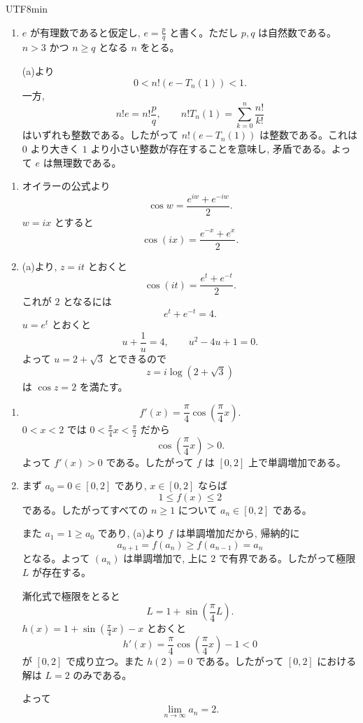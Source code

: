 \documentclass[a4paper,12pt]{article}
\newcommand{\ans}[1]{\par\vspace{0.8em}\noindent{\large 問題 #1}\quad}
\begin{document}
\begin{CJK}{UTF8}{min}
\begin{enumerate}
\item $e$ が有理数であると仮定し, $e=\frac{p}{q}$ と書く。ただし $p,q$ は自然数である。$n>3$ かつ $n\ge q$ となる $n$ をとる。

(a)より
\[
0<n!\left(e-T_n(1)\right)<1.
\]
一方,
\[
n!e=n!\frac{p}{q},\qquad
n!T_n(1)=\sum_{k=0}^{n}\frac{n!}{k!}
\]
はいずれも整数である。したがって $n!(e-T_n(1))$ は整数である。これは $0$ より大きく $1$ より小さい整数が存在することを意味し, 矛盾である。よって $e$ は無理数である。
\end{enumerate}

\ans{9}
\begin{enumerate}
\item オイラーの公式より
\[
\cos w=\frac{e^{iw}+e^{-iw}}{2}.
\]
$w=ix$ とすると
\[
\cos(ix)=\frac{e^{-x}+e^x}{2}.
\]

\item (a)より, $z=it$ とおくと
\[
\cos(it)=\frac{e^t+e^{-t}}{2}.
\]
これが $2$ となるには
\[
e^t+e^{-t}=4.
\]
$u=e^t$ とおくと
\[
u+\frac1u=4,\qquad u^2-4u+1=0.
\]
よって $u=2+\sqrt3$ とできるので
\[
z=i\log(2+\sqrt3)
\]
は $\cos z=2$ を満たす。
\end{enumerate}

\ans{10}
\begin{enumerate}
\item
\[
f'(x)=\frac{\pi}{4}\cos\left(\frac{\pi}{4}x\right).
\]
$0<x<2$ では $0<\frac{\pi}{4}x<\frac{\pi}{2}$ だから
\[
\cos\left(\frac{\pi}{4}x\right)>0.
\]
よって $f'(x)>0$ である。したがって $f$ は $[0,2]$ 上で単調増加である。

\item まず $a_0=0\in[0,2]$ であり, $x\in[0,2]$ ならば
\[
1\le f(x)\le 2
\]
である。したがってすべての $n\ge 1$ について $a_n\in[0,2]$ である。

また $a_1=1\ge a_0$ であり, (a)より $f$ は単調増加だから, 帰納的に
\[
a_{n+1}=f(a_n)\ge f(a_{n-1})=a_n
\]
となる。よって $(a_n)$ は単調増加で, 上に $2$ で有界である。したがって極限 $L$ が存在する。

漸化式で極限をとると
\[
L=1+\sin\left(\frac{\pi}{4}L\right).
\]
$h(x)=1+\sin\left(\frac{\pi}{4}x\right)-x$ とおくと
\[
h'(x)=\frac{\pi}{4}\cos\left(\frac{\pi}{4}x\right)-1<0
\]
が $[0,2]$ で成り立つ。また $h(2)=0$ である。したがって $[0,2]$ における解は $L=2$ のみである。

よって
\[
\lim_{n\to\infty}a_n=2.
\]
\end{enumerate}

\ifPDFTeX
\end{CJK}
\fi
\end{document}
